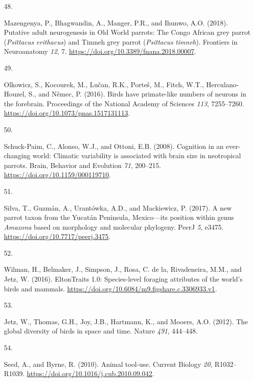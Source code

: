 \documentclass[
  man, donotrepeattitle,floatsintext]{apa6}
\newlength{\cslhangindent}
\newlength{\csllabelwidth}
\newlength{\cslentryspacingunit} %
\newenvironment{CSLReferences}[2] %
 {%
  \setlength{\parindent}{0pt}
  \ifodd #1
  \let\oldpar\par
  \def\par{\hangindent=\cslhangindent\oldpar}
  \fi
  \setlength{\parskip}{#2\cslentryspacingunit}
 }%
 {}
\newcommand{\CSLLeftMargin}[1]{\parbox[t]{\csllabelwidth}{#1}}
\newcommand{\CSLRightInline}[1]{\parbox[t]{\linewidth - \csllabelwidth}{#1}\break}
\begin{document}
\begin{CSLReferences}{0}{0}
\leavevmode{}%
\CSLLeftMargin{48. }%
\CSLRightInline{Mazengenya, P., Bhagwandin, A., Manger, P.R., and Ihunwo, A.O. (2018). Putative adult neurogenesis in {O}ld {W}orld parrots: The {C}ongo {A}frican grey parrot (\emph{{P}sittacus erithacus}) and {T}imneh grey parrot (\emph{{P}sittacus timneh}). Frontiers in Neuroanatomy \emph{12}, 7. \url{https://doi.org/10.3389/fnana.2018.00007}.}

\leavevmode{}%
\CSLLeftMargin{49. }%
\CSLRightInline{Olkowicz, S., Kocourek, M., Lučan, R.K., Porteš, M., Fitch, W.T., Herculano-Houzel, S., and Němec, P. (2016). Birds have primate-like numbers of neurons in the forebrain. Proceedings of the National Academy of Sciences \emph{113}, 7255--7260. \url{https://doi.org/10.1073/pnas.1517131113}.}

\leavevmode{}%
\CSLLeftMargin{50. }%
\CSLRightInline{Schuck-Paim, C., Alonso, W.J., and Ottoni, E.B. (2008). Cognition in an ever-changing world: Climatic variability is associated with brain size in neotropical parrots. Brain, Behavior and Evolution \emph{71}, 200--215. \url{https://doi.org/10.1159/000119710}.}

\leavevmode{}%
\CSLLeftMargin{51. }%
\CSLRightInline{Silva, T., Guzmán, A., Urantówka, A.D., and Mackiewicz, P. (2017). A new parrot taxon from the {Y}ucat{á}n {P}eninsula, {M}exico---its position within genus \emph{{A}mazona} based on morphology and molecular phylogeny. PeerJ \emph{5}, e3475. \url{https://doi.org/10.7717/peerj.3475}.}

\leavevmode{}%
\CSLLeftMargin{52. }%
\CSLRightInline{Wilman, H., Belmaker, J., Simpson, J., Rosa, C. de la, Rivadeneira, M.M., and Jetz, W. (2016). EltonTraits 1.0: Species-level foraging attributes of the world's birds and mammals. \url{https://doi.org/10.6084/m9.figshare.c.3306933.v1}.}

\leavevmode{}%
\CSLLeftMargin{53. }%
\CSLRightInline{Jetz, W., Thomas, G.H., Joy, J.B., Hartmann, K., and Mooers, A.O. (2012). The global diversity of birds in space and time. Nature \emph{491}, 444--448.}

\leavevmode{}%
\CSLLeftMargin{54. }%
\CSLRightInline{Seed, A., and Byrne, R. (2010). Animal tool-use. Current Biology \emph{20}, R1032--R1039. \url{https://doi.org/10.1016/j.cub.2010.09.042}.}


\end{CSLReferences}
\end{document}
